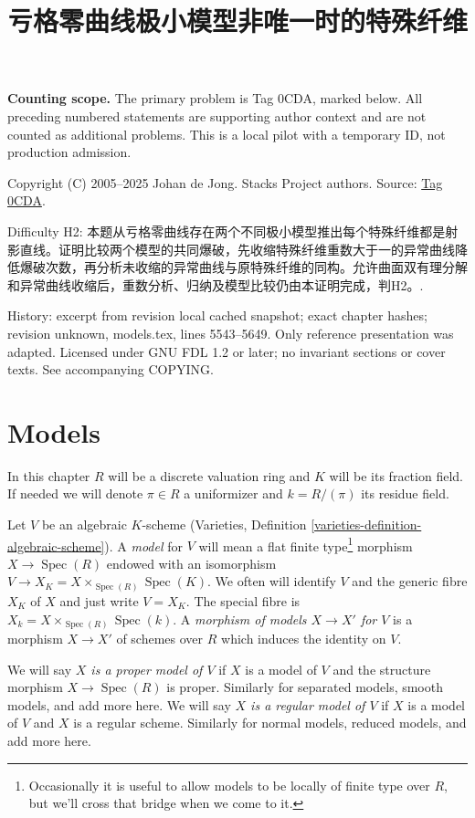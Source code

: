 \documentclass{amsart}
\theoremstyle{plain}
\theoremstyle{definition}
\theoremstyle{remark}
\numberwithin{equation}{subsection}
\def\Spec{\mathop{\mathrm{Spec}}}
\begin{document}
\title[Stacks Project, Tag 0CDA]{亏格零曲线极小模型非唯一时的特殊纤维}
\maketitle
\noindent\textbf{Counting scope.} The primary problem is Tag 0CDA, marked below. All preceding numbered statements are supporting author context and are not counted as additional problems. This is a local pilot with a temporary ID, not production admission.


\noindent Copyright (C) 2005--2025 Johan de Jong. Stacks Project authors. Source: \href{https://stacks.math.columbia.edu/tag/0CDA}{Tag 0CDA}.

\noindent Difficulty H2: 本题从亏格零曲线存在两个不同极小模型推出每个特殊纤维都是射影直线。证明比较两个模型的共同爆破，先收缩特殊纤维重数大于一的异常曲线降低爆破次数，再分析未收缩的异常曲线与原特殊纤维的同构。允许曲面双有理分解和异常曲线收缩后，重数分析、归纳及模型比较仍由本证明完成，判H2。.

\noindent History: excerpt from revision local cached snapshot; exact chapter hashes; revision unknown, models.tex, lines 5543--5649. Only reference presentation was adapted. Licensed under GNU FDL 1.2 or later; no invariant sections or cover texts. See accompanying COPYING.

\section{Models}
\label{section-models}

\noindent
In this chapter $R$ will be a discrete valuation ring and $K$ will
be its fraction field. If needed we will denote $\pi \in R$ a
uniformizer and $k = R/(\pi)$ its residue field.

\medskip\noindent
Let $V$ be an algebraic $K$-scheme
(Varieties, Definition \ref{varieties-definition-algebraic-scheme}).
A {\it model} for $V$ will
mean a flat finite type\footnote{Occasionally it is useful to
allow models to be locally of finite type over $R$, but we'll
cross that bridge when we come to it.}
morphism $X \to \Spec(R)$ endowed with
an isomorphism $V \to X_K = X \times_{\Spec(R)} \Spec(K)$. We often
will identify $V$ and the generic fibre $X_K$ of $X$ and
just write $V = X_K$.
The special fibre is $X_k = X \times_{\Spec(R)} \Spec(k)$.
A {\it morphism of models $X \to X'$ for $V$}
is a morphism $X \to X'$ of schemes over $R$ which induces
the identity on $V$.

\medskip\noindent
We will say {\it $X$ is a proper model of $V$} if $X$ is a model
of $V$ and the structure morphism $X \to \Spec(R)$ is proper.
Similarly for separated models, smooth models, and add more here.
We will say {\it $X$ is a regular model of $V$} if $X$ is a model
of $V$ and $X$ is a regular scheme.
Similarly for normal models, reduced models, and add more here.
\end{document}
